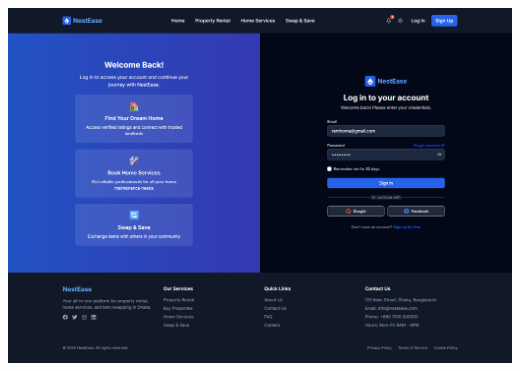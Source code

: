\documentclass[conference]{IEEEtran}
\begin{document}
\begin{center}
\begin{minipage}[t]{0.45\textwidth}
\includegraphics[width=\linewidth]{Project Screenshot/LogIn.png}
\end{minipage}


\end{center}
\end{document}
